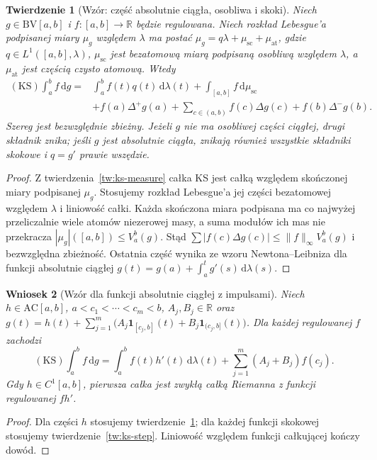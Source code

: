\documentclass[11pt,a4paper]{article}
\numberwithin{equation}{section}
\theoremstyle{plain}
\newtheorem{twierdzenie}{Twierdzenie}[section]
\newtheorem{wniosek}[twierdzenie]{Wniosek}
\theoremstyle{definition}
\theoremstyle{remark}
\newcommand{\R}{\mathbb R}
\newcommand{\ind}[1]{\mathbf 1_{#1}}
\newcommand{\AC}{\mathrm{AC}}
\newcommand{\BV}{\mathrm{BV}}
\newcommand{\KS}{\mathrm{KS}}
\begin{document}
\begin{twierdzenie}[Wzór: część absolutnie ciągła, osobliwa i skoki]
\label{tw:ks-decomp}
Niech $g\in\BV[a,b]$ i $f:[a,b]\to\R$ będzie regulowana. Niech rozkład Lebesgue'a podpisanej miary $\mu_g$ względem $\lambda$ ma postać
$\mu_g=q\lambda+\mu_{\mathrm{sc}}+\mu_{\mathrm{at}}$, gdzie $q\in L^1([a,b],\lambda)$, $\mu_{\mathrm{sc}}$ jest bezatomową miarą podpisaną osobliwą względem $\lambda$, a $\mu_{\mathrm{at}}$ jest częścią czysto atomową. Wtedy
\[
 \begin{aligned}
 (\KS)\int_a^b f\,\mathrm dg
 ={}&\int_a^b f(t)q(t)\,\mathrm d\lambda(t)
 +\int_{[a,b]}f\,\mathrm d\mu_{\mathrm{sc}}\\
 &+f(a)\Delta^+g(a)+\sum_{c\in(a,b)}f(c)\Delta g(c)
 +f(b)\Delta^-g(b).
 \end{aligned}
\]
Szereg jest bezwzględnie zbieżny. Jeżeli $g$ nie ma osobliwej części ciągłej, drugi składnik znika; jeśli $g$ jest absolutnie ciągła, znikają również wszystkie składniki skokowe i $q=g'$ prawie wszędzie.
\end{twierdzenie}
\begin{proof}
Z twierdzenia~\ref{tw:ks-measure} całka KS jest całką względem skończonej miary podpisanej $\mu_g$. Stosujemy rozkład Lebesgue'a jej części bezatomowej względem $\lambda$ i liniowość całki. Każda skończona miara podpisana ma co najwyżej przeliczalnie wiele atomów niezerowej masy, a suma modułów ich mas nie przekracza $|\mu_g|([a,b])\le V_a^b(g)$. Stąd $\sum|f(c)\Delta g(c)|\le\|f\|_\infty V_a^b(g)$ i bezwzględna zbieżność. Ostatnia część wynika ze wzoru Newtona--Leibniza dla funkcji absolutnie ciągłej $g(t)=g(a)+\int_a^t g'(s)\,\mathrm d\lambda(s)$.
\end{proof}

\begin{wniosek}[Wzór dla funkcji absolutnie ciągłej z impulsami]
\label{wn:ks-ac-jumps}
Niech $h\in\AC[a,b]$, $a<c_1<\cdots<c_m<b$, $A_j,B_j\in\R$ oraz
$g(t)=h(t)+\sum_{j=1}^m\bigl(A_j\ind{[c_j,b]}(t)+B_j\ind{(c_j,b]}(t)\bigr)$. Dla każdej regulowanej $f$ zachodzi
\[
 (\KS)\int_a^b f\,\mathrm dg
 =\int_a^b f(t)h'(t)\,\mathrm d\lambda(t)
 +\sum_{j=1}^m(A_j+B_j)f(c_j).
\]
Gdy $h\in C^1[a,b]$, pierwsza całka jest zwykłą całką Riemanna z funkcji regulowanej $fh'$.
\end{wniosek}
\begin{proof}
Dla części $h$ stosujemy twierdzenie~\ref{tw:ks-decomp}; dla każdej funkcji skokowej stosujemy twierdzenie~\ref{tw:ks-step}. Liniowość względem funkcji całkującej kończy dowód.
\end{proof}
\end{document}
